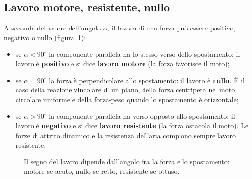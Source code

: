 \subsection{Lavoro motore, resistente, nullo}

A seconda del valore dell'angolo $\alpha$, il lavoro di una forza può essere positivo, negativo o nullo (figura~\ref{fig:lavoro-segni}):
\begin{itemize}
    \item se $\alpha < 90^\circ$ la componente parallela ha lo stesso verso dello spostamento: il lavoro è \textbf{positivo} e si dice \textbf{lavoro motore} (la forza favorisce il moto);
    \item se $\alpha = 90^\circ$ la forza è perpendicolare allo spostamento: il lavoro è \textbf{nullo}. È il caso della reazione vincolare di un piano, della forza centripeta nel moto circolare uniforme e della forza-peso quando lo spostamento è orizzontale;
    \item se $\alpha > 90^\circ$ la componente parallela ha verso opposto allo spostamento: il lavoro è \textbf{negativo} e si dice \textbf{lavoro resistente} (la forza ostacola il moto). Le forze di attrito dinamico e la resistenza dell'aria compiono sempre lavoro resistente.
\end{itemize}

\begin{figure}[!htbp]
    \centering
    \caption{Il segno del lavoro dipende dall'angolo fra la forza e lo spostamento: motore se acuto, nullo se retto, resistente se ottuso.}
    \label{fig:lavoro-segni}
\end{figure}

